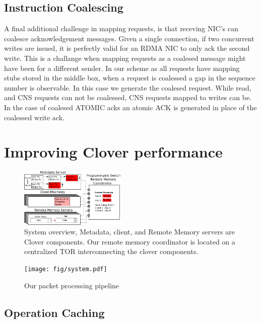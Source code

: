 \subsection{Instruction Coalescing} A final additional challenge in mapping
requests, is that receving NIC's can coalesce acknowledgement messages. Given a
single connection, if two concurrent writes are issued, it is perfectly valid
for an RDMA NIC to only ack the second write. This is a challange when mapping
requests as a coalesed message might have been for a different sender. In our
scheme as all requests have mapping stubs stored in the middle box, when a
request is coalessed a gap in the sequence number is observable. In this case we
generate the coalesed request. While read, and CNS requests can not be
coalessed, CNS requests mapped to writes can be. In the case of coalesed ATOMIC
acks an atomic ACK is generated in place of the coalessed write ack.



\section{Improving Clover performance}


\begin{figure}
    \includegraphics[width=0.45\textwidth]{fig/overview_2.png}
    \caption{ System overview, Metadata, client, and Remote Memory
    servers are Clover components. Our remote memory coordinator is
    located on a centralized TOR interconnecting the clover components.
    }
    \label{fig:overview} 
\end{figure}

\begin{figure}
    \texttt{[image: fig/system.pdf]}
    \caption{Our packet processing pipeline}
    \label{fig:system}
\end{figure}


\subsection{Operation Caching}
\label{sec:operation-caching}

